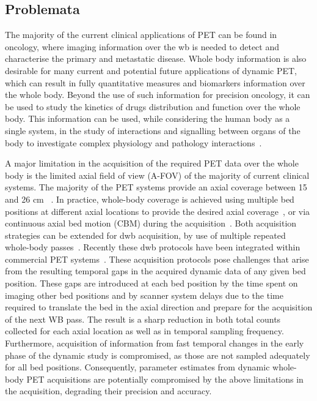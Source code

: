 \subsection*{Problemata}
The majority of the current clinical applications of PET can be found in oncology, where imaging information over the \gls{wb} is needed to detect and characterise the primary and metastatic disease. 
Whole body information is also desirable for many current and potential future applications of dynamic PET, which can result in fully quantitative measures and biomarkers information over the whole body. Beyond the use of such information for precision oncology, it can be used to study the kinetics of drugs distribution and function over the whole body.
This information can be used, while considering the human body as a single system, in the study of interactions and signalling between organs of the body to investigate complex physiology and pathology interactions~\cite{Meikle2021,Slart2021}.

A major limitation in the acquisition of the required PET data over the whole body is the limited axial field of view (A-FOV) of the majority of current clinical systems. The majority of the PET systems provide an axial coverage between 15 and 26 cm ~\cite{Vandenberghe2020}. 
In practice, whole-body coverage is achieved using multiple bed positions at different axial locations to provide the desired axial coverage~\cite{Schubert1996}, or via continuous axial bed motion (CBM) during the acquisition~\cite{Panin2014}. 
Both acquisition strategies can be extended for \gls{dwb} acquisition, by use of multiple repeated whole-body passes~\cite {Karakatsanis2011,Karakatsanis2013,Rahmim2019}.
Recently these \gls{dwb} protocols have been integrated within commercial PET systems~\cite{Hu2020}. 
These acquisition protocols pose challenges that arise from the resulting temporal gaps in the acquired dynamic data of any given bed position. These gaps are introduced at each bed position by the time spent on imaging other bed positions and by scanner system delays due to the time required to translate the bed in the axial direction and prepare for the acquisition of the next WB pass. The result is a sharp reduction in both total counts collected for each axial location as well as in temporal sampling frequency. Furthermore, acquisition of information from fast temporal changes in the early phase of the dynamic study is compromised, as those are not sampled adequately for all bed positions. Consequently, parameter estimates from dynamic whole-body PET acquisitions are potentially compromised by the above limitations in the acquisition, degrading their precision and accuracy.

